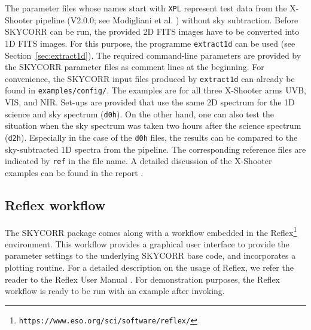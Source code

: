 The parameter files whose names start with {\tt XPL} represent test data from
the X-Shooter pipeline (V2.0.0; see Modigliani et al. \cite{MOD10}) without sky
subtraction. Before SKYCORR can be run, the provided 2D \ac{FITS} images have
to be converted into 1D \ac{FITS} images. For this purpose, the programme
{\tt extract1d} can be used (see Section~\ref{sec:extract1d}). The required
command-line parameters are provided by the SKYCORR parameter files as comment
lines at the beginning. For convenience, the SKYCORR input files produced by
{\tt extract1d} can already be found in {\tt examples/config/}. The examples
are for all three X-Shooter arms UVB, VIS, and NIR. Set-ups are provided that
use the same 2D spectrum for the 1D science and sky spectrum ({\tt d0h}). On
the other hand, one can also test the situation when the sky spectrum was taken
two hours after the science spectrum ({\tt d2h}). Especially in the case of the
{\tt d0h} files, the results can be compared to the sky-subtracted 1D spectra
from the pipeline. The corresponding reference files are indicated by {\tt ref}
in the file name. A detailed discussion of the X-Shooter examples can be found
in the report \cite{SM03SR}.

\subsection{Reflex workflow}\label{sec:reflex}
The SKYCORR package comes along with a workflow embedded in the
Reflex\footnote{\tt https://www.eso.org/sci/software/reflex/} environment. This
workflow provides a graphical user interface to provide the parameter settings
to the underlying SKYCORR base code, and incorporates a plotting routine. For a
detailed description on the usage of Reflex, we refer the reader to the Reflex
User Manual \cite{reflex}. For demonstration purposes, the Reflex workflow is
ready to be run with an example after invoking.

